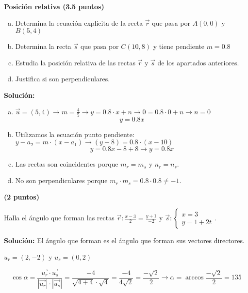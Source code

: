\documentclass[palatino,noprobframes]{CuartillaSafa}
\renewcommand{\vec}[1]{\overrightarrow{#1}}
\begin{document}
\begin{problem}\textbf{ Posición relativa (3.5 puntos)}
\begin{enumerate}[a)]
	\vspace{-0.3cm}\item Determina la ecuación explícita de la recta $\vec{r}$ que pasa por $A(0,0)$ y $B(5,4)$ 
	\vspace{-0.3cm}\item Determina la recta $\vec{s}$ que pasa por $C(10,8)$ y tiene pendiente $m=0.8$ 
	\vspace{-0.3cm}\item Estudia la posición relativa de las rectas $\vec{r}$ y $\vec{s}$ de los apartados anteriores. 
	\vspace{-0.3cm}\item Justifica si son perpendiculares. 
\end{enumerate}
\textbf{Solución:}
\begin{enumerate}[a)]
	\item $\vec{u} = (5,4) \to m = \frac{4}{5} \to y=0.8·x+n \to 0=0.8·0+n \to n=0$\[y=0.8x\]
	\item Utilizamos la ecuación punto pendiente: $y-a_2 = m·(x-a_1) \to (y-8)=0.8·(x-10)$
	\[y=0.8x-8+8 \to y=0.8x\]
	\item Las rectas son coincidentes porque $m_r = m_s$ y $n_r = n_s$.
	\item No son perpendiculares porque $m_r·m_s = 0.8·0.8 \neq -1$.
\end{enumerate}


\end{problem}

\newpage

\begin{problem}\textbf{(2 puntos)}

Halla el ángulo que forman las rectas $\displaystyle \vec{r}: \frac{x-3}{2} = \frac{y+1}{-2}$ y $\vec{s}: \left\{\begin{array}{c} x=3\\y=1+2t\end{array}\right.$. 

\textbf{Solución:}
El ángulo que forman es el ángulo que forman sus vectores directores.

$u_r = (2,-2)$ y $u_s = (0,2)$

\[
\cos α = \frac{\vec{u_r}·\vec{u_s}}{|\vec{u_r}|·|\vec{u_s}|} = \frac{-4}{\sqrt{4+4}·\sqrt{4}} = \frac{-4}{4\sqrt{2}} = \frac{-\sqrt{2}}{2} \to α=\arccos{\frac{-\sqrt{2}}{2} = 135}
\]



\end{problem}
\end{document}
